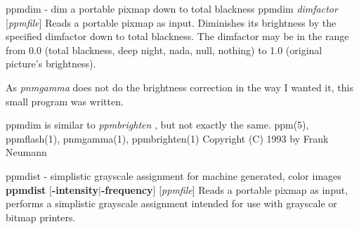 %

\newpage
%

ppmdim - dim a portable pixmap down to total blackness
ppmdim
{\it dimfactor}
{\rm [}{\it ppmfile}{\rm ]}
Reads a portable pixmap as input. Diminishes its brightness by
the specified dimfactor down to total blackness.
The dimfactor may be in the range from 0.0 (total blackness,
deep night, nada, null, nothing) to 1.0 (original picture's
brightness).
\par
As
{\it pnmgamma}
does not do the brightness correction in the way I
wanted it, this small program was written.
\par
ppmdim is similar to
{\it ppmbrighten}
, but not exactly the same.
ppm(5), ppmflash(1), pnmgamma(1), ppmbrighten(1)
Copyright (C) 1993 by Frank Neumann
%

%

\newpage
%

ppmdist - simplistic grayscale assignment for machine generated, color images
{\bf ppmdist}
{\rm [}{\bf -intensity}{\rm $|$}{\bf -frequency}{\rm ]}
{\rm [}{\it ppmfile}{\rm ]}
Reads a portable pixmap as input, performs a simplistic grayscale
assignment intended for use with grayscale or bitmap printers.

